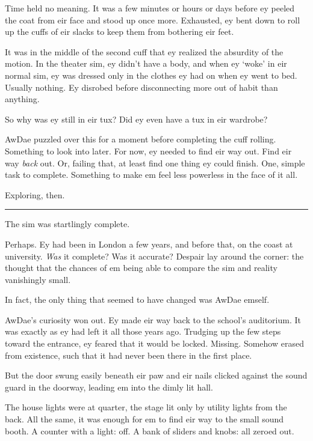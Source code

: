 Time held no meaning. It was a few minutes or hours or days before ey peeled the coat from eir face and stood up once more. Exhausted, ey bent down to roll up the cuffs of eir slacks to keep them from bothering eir feet.

It was in the middle of the second cuff that ey realized the absurdity of the motion. In the theater sim, ey didn't have a body, and when ey `woke' in eir normal sim, ey was dressed only in the clothes ey had on when ey went to bed. Usually nothing. Ey disrobed before disconnecting more out of habit than anything.

So why was ey still in eir tux? Did ey even have a tux in eir wardrobe?

AwDae puzzled over this for a moment before completing the cuff rolling. Something to look into later. For now, ey needed to find eir way out. Find eir way \emph{back} out. Or, failing that, at least find one thing ey could finish. One, simple task to complete. Something to make em feel less powerless in the face of it all.

Exploring, then.

\begin{center}\rule{0.5\linewidth}{0.5pt}\end{center}

The sim was startlingly complete.

Perhaps. Ey had been in London a few years, and before that, on the coast at university. \emph{Was} it complete? Was it accurate? Despair lay around the corner: the thought that the chances of em being able to compare the sim and reality vanishingly small.

In fact, the only thing that seemed to have changed was AwDae emself.

AwDae's curiosity won out. Ey made eir way back to the school's auditorium. It was exactly as ey had left it all those years ago. Trudging up the few steps toward the entrance, ey feared that it would be locked. Missing. Somehow erased from existence, such that it had never been there in the first place.

But the door swung easily beneath eir paw and eir nails clicked against the sound guard in the doorway, leading em into the dimly lit hall.

The house lights were at quarter, the stage lit only by utility lights from the back. All the same, it was enough for em to find eir way to the small sound booth. A counter with a light: off. A bank of sliders and knobs: all zeroed out.

